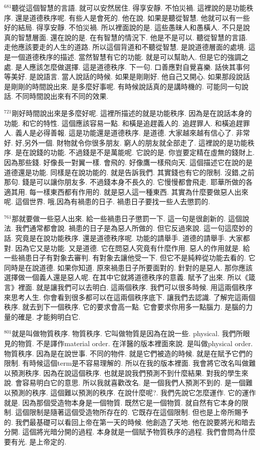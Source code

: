 \documentclass{book}
\begin{document}
$^{681}$聽從這個智慧的言語.
就可以安然居住.
得享安靜.
不怕災禍.
這裡說的是功能秩序.
還是道德秩序呢.
有些人是會死的.
他在說.
如果是聽從智慧.
他就可以有一些好的結局.
得享安靜.
不怕災禍.
所以裡面說的是.
這些愚昧人和愚橫人.
不只是說真的智慧層面.
還在說的是.
在有智慧的情況下.
他是不是可以.
聽從智慧的言語.
走他應該要走的人生的道路.
所以這個背道和不聽從智慧.
是說道德層面的處境.
這是一個道德秩序的描述.
當然智慧有它的功能.
就是可以幫助人.
但是它的強調之處.
是人應該怎麼做選擇.
這是道德秩序.
下一句.
口善應對自覺喜樂.
話俠其事何等美好.
是說語言.
當人說話的時候.
如果是剛剛好.
他自己又開心.
如果那段說話是剛剛的時間說出來.
是多麼好事呢.
有時候說話真的是講時機的.
可能同一句說話.
不同時間說出來有不同的效果.

$^{721}$剛好時間說出來是多麼好呢.
這裡所描述的就是功能秩序.
因為是在說話本身的功能.
和它的特性.
這個應該容易一點.
和橫是追趕義人的.
追趕罪人.
和橫追趕罪人.
義人是必得善報.
這是功能還是道德秩序.
是道德.
大家越來越有信心了.
非常好.
好,另外一個.
財物就令你很多朋友.
窮人的朋友就全部走了.
這裡說的是功能秩序.
是在說錢的功能.
不過錢是不是萬能呢.
它說的是.
你豈要定精在虛無的錢財上.
因為那些錢.
好像長一對翼一樣.
會飛的.
好像鷹一樣飛向天.
這個描述它在說的是道德還是功能.
同樣是在說功能的.
就是告訴我們.
其實錢也有它的限制.
沒錯,之前那句.
錢是可以讓你朋友多.
不過錢本身不長久的.
它慢慢都會飛走.
耶華所做的各適其用.
每一樣東西都有作用的.
就是惡人這一種東西.
其實為什麼要做惡人出來呢.
這個世界.
哦,因為有禍患的日子.
禍患日子要找一些人去懲罰的.

$^{761}$那就要做一些惡人出來.
給一些禍患日子懲罰一下.
這一句是很創新的.
這個說法.
我們通常都會說.
禍患的日子是為惡人所做的.
但它反過來說.
這一句這麼妙的話.
究竟是在說功能秩序.
還是道德秩序呢.
功能的請舉手.
道德的請舉手.
大家都對.
因為它又是功能.
又是道德.
它在問惡人究竟有什麼作用.
惡人的作用就是.
給一些禍患日子有對象去審判.
有對象去讓他受一下.
但它不是純粹從功能去看的.
它同時是在說道德.
如果你知道.
原來禍患日子所要面對的.
針對的是惡人.
那你應該選擇做一個義人還是惡人呢.
在其中它就將道德秩序的意義.
賦予了出來.
所以《箴言》裡面.
就是讓我們可以去明白.
這兩個秩序.
我們可以很多時候.
用這兩個秩序來思考人生.
你會看到很多都可以在這兩個秩序底下.
讓我們去認識.
了解完這兩個秩序.
就去到下一個秩序.
它的要求會高一點.
它會要求你用多一點腦力.
是腦的力量的確是.
才能夠明白它.

$^{801}$就是叫做物質秩序.
物質秩序.
它叫做物質是因為在說一些.
physical.
我們所眼見的物質.
不是譯作material order.
在洋醫的版本裡面來說.
是叫做physical order.
物質秩序.
因為是在說世事.
不同的物件.
就是它們被造的時候.
就是在賦予它們的限制.
有時候這個term是不容易理解的.
所以在我的版本裡面.
我會將它改名叫做難以預測秩序.
因為在說這個秩序.
也就是說我們預測不到什麼結果.
對我的學生來說.
會容易明白它的意思.
所以我就喜歡改名.
是一個我們人預測不到的.
是一個難以預測的秩序.
這個難以預測的秩序.
在說什麼呢?.
我們先說它怎麼運作.
它的運作就是.
因為那個受造物本身是一個物質.
既然它是一個物質.
就自然有它本身的限制.
這個限制是隨著這個受造物所存在的.
它既存在這個限制.
但也是上帝所賜予的.
我們最基礎可以看回上帝在第一天的時候.
他創造了天地.
他在說要將光和暗去分開.
這個將光暗分開的過程.
本身就是一個賦予物質秩序的過程.
我們會問為什麼要有光.
是上帝定的.
\end{document}
